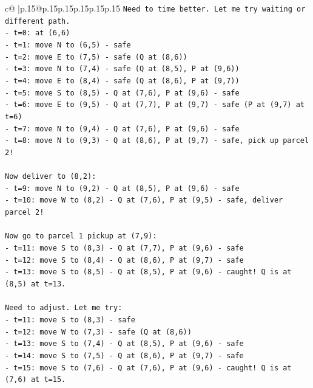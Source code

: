 \documentclass{article}
\begin{document}
{\begin{supertabular}{c@{$\;$}|p{.15\linewidth}@{}p{.15\linewidth}p{.15\linewidth}p{.15\linewidth}p{.15\linewidth}p{.15\linewidth}}
{{{\texttt{Need to time better. Let me try waiting or different path.} \\
\texttt{{-} t=0: at (6,6)} \\
\texttt{{-} t=1: move N to (6,5) {-} safe} \\
\texttt{{-} t=2: move E to (7,5) {-} safe (Q at (8,6))} \\
\texttt{{-} t=3: move N to (7,4) {-} safe (Q at (8,5), P at (9,6))} \\
\texttt{{-} t=4: move E to (8,4) {-} safe (Q at (8,6), P at (9,7))} \\
\texttt{{-} t=5: move S to (8,5) {-} Q at (7,6), P at (9,6) {-} safe} \\
\texttt{{-} t=6: move E to (9,5) {-} Q at (7,7), P at (9,7) {-} safe (P at (9,7) at t=6)} \\
\texttt{{-} t=7: move N to (9,4) {-} Q at (7,6), P at (9,6) {-} safe} \\
\texttt{{-} t=8: move N to (9,3) {-} Q at (8,6), P at (9,7) {-} safe, pick up parcel 2!} \\
\\ 
\texttt{Now deliver to (8,2):} \\
\texttt{{-} t=9: move N to (9,2) {-} Q at (8,5), P at (9,6) {-} safe} \\
\texttt{{-} t=10: move W to (8,2) {-} Q at (7,6), P at (9,5) {-} safe, deliver parcel 2!} \\
\\ 
\texttt{Now go to parcel 1 pickup at (7,9):} \\
\texttt{{-} t=11: move S to (8,3) {-} Q at (7,7), P at (9,6) {-} safe} \\
\texttt{{-} t=12: move S to (8,4) {-} Q at (8,6), P at (9,7) {-} safe} \\
\texttt{{-} t=13: move S to (8,5) {-} Q at (8,5), P at (9,6) {-} caught! Q is at (8,5) at t=13.} \\
\\ 
\texttt{Need to adjust. Let me try:} \\
\texttt{{-} t=11: move S to (8,3) {-} safe} \\
\texttt{{-} t=12: move W to (7,3) {-} safe (Q at (8,6))} \\
\texttt{{-} t=13: move S to (7,4) {-} Q at (8,5), P at (9,6) {-} safe} \\
\texttt{{-} t=14: move S to (7,5) {-} Q at (8,6), P at (9,7) {-} safe} \\
\texttt{{-} t=15: move S to (7,6) {-} Q at (7,6), P at (9,6) {-} caught! Q is at (7,6) at t=15.} \\
}}}
\end{supertabular}}
\end{document}
